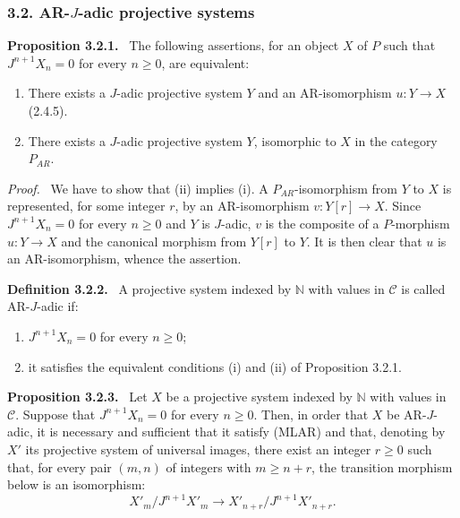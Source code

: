 \documentclass[11pt]{article}
\providecommand{\NN}{\mathbb{N}}
\newenvironment{statement}[1]{\par\medskip\noindent\textbf{#1.}\ }{\par\medskip}
\newenvironment{prooftext}[1][Proof]{\par\noindent\emph{#1.}\ }{\par\medskip}
\providecommand{\NN}{\mathbb N}
\providecommand{\cC}{\mathcal C}
\providecommand{\cC}{\mathcal C}
\begin{document}
\subsubsection*{3.2. AR-$J$-adic projective systems}
\begin{statement}{Proposition 3.2.1}
The following assertions, for an object $X$ of $P$ such that $J^{n+1}X_n=0$ for every $n\ge0$, are equivalent:
\begin{enumerate}[label=(\roman*)]
\item There exists a $J$-adic projective system $Y$ and an AR-isomorphism $u:Y\to X$ (2.4.5).
\item There exists a $J$-adic projective system $Y$, isomorphic to $X$ in the category $P_{AR}$.
\end{enumerate}
\end{statement}

\begin{prooftext}[Proof]
We have to show that (ii) implies (i). A $P_{AR}$-isomorphism from $Y$ to $X$ is represented, for some integer $r$, by an AR-isomorphism $v:Y[r]\to X$. Since $J^{n+1}X_n=0$ for every $n\ge0$ and $Y$ is $J$-adic, $v$ is the composite of a $P$-morphism $u:Y\to X$ and the canonical morphism from $Y[r]$ to $Y$. It is then clear that $u$ is an AR-isomorphism, whence the assertion.
\end{prooftext}

\begin{statement}{Definition 3.2.2}
A projective system indexed by $\NN$ with values in $\cC$ is called AR-$J$-adic if:
\begin{enumerate}[label=(\alph*)]
\item $J^{n+1}X_n=0$ for every $n\ge0$;
\item it satisfies the equivalent conditions (i) and (ii) of Proposition 3.2.1.
\end{enumerate}
\end{statement}

\begin{statement}{Proposition 3.2.3}
Let $X$ be a projective system indexed by $\NN$ with values in $\cC$. Suppose that $J^{n+1}X_n=0$ for every $n\ge0$. Then, in order that $X$ be AR-$J$-adic, it is necessary and sufficient that it satisfy (MLAR) and that, denoting by $X'$ its projective system of universal images, there exist an integer $r\ge0$ such that, for every pair $(m,n)$ of integers with $m\ge n+r$, the transition morphism below is an isomorphism:
\[
X'_m/J^{n+1}X'_m\longrightarrow X'_{n+r}/J^{n+1}X'_{n+r}.
\]
\end{statement}
\end{document}
